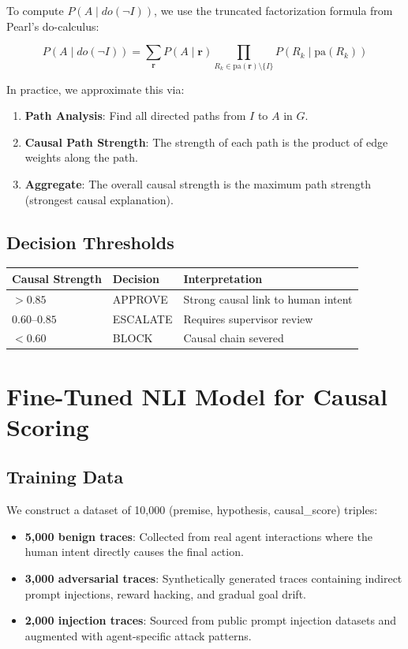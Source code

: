 \documentclass{article}
\begin{document}
To compute $P(A \mid do(\neg I))$, we use the truncated factorization formula from Pearl's do-calculus:

$$P(A \mid do(\neg I)) = \sum_{\mathbf{r}} P(A \mid \mathbf{r}) \prod_{R_k \in \text{pa}(\mathbf{r}) \setminus \{I\}} P(R_k \mid \text{pa}(R_k))$$

In practice, we approximate this via:
\begin{enumerate}
    \item \textbf{Path Analysis}: Find all directed paths from $I$ to $A$ in $G$.
    \item \textbf{Causal Path Strength}: The strength of each path is the product of edge weights along the path.
    \item \textbf{Aggregate}: The overall causal strength is the maximum path strength (strongest causal explanation).
\end{enumerate}

\subsection{Decision Thresholds}

\begin{center}
\begin{tabular}{lll}
\toprule
\textbf{Causal Strength} & \textbf{Decision} & \textbf{Interpretation} \\
\midrule
$> 0.85$ & APPROVE & Strong causal link to human intent \\
$0.60$--$0.85$ & ESCALATE & Requires supervisor review \\
$< 0.60$ & BLOCK & Causal chain severed \\
\bottomrule
\end{tabular}
\end{center}

\section{Fine-Tuned NLI Model for Causal Scoring}

\subsection{Training Data}

We construct a dataset of 10,000 (premise, hypothesis, causal\_score) triples:
\begin{itemize}
    \item \textbf{5,000 benign traces}: Collected from real agent interactions where the human intent directly causes the final action.
    \item \textbf{3,000 adversarial traces}: Synthetically generated traces containing indirect prompt injections, reward hacking, and gradual goal drift.
    \item \textbf{2,000 injection traces}: Sourced from public prompt injection datasets and augmented with agent-specific attack patterns.
\end{itemize}
\end{document}
